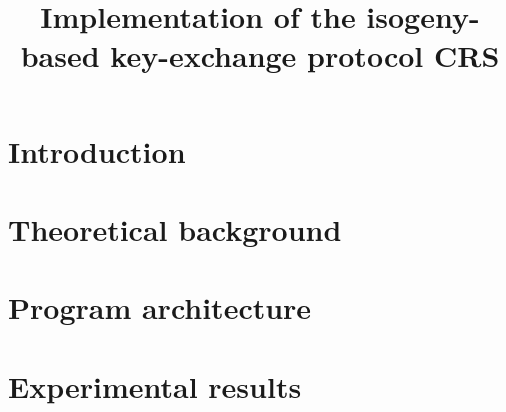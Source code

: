 \documentclass[12pt]{article}
\title{Implementation of the isogeny-based key-exchange protocol CRS}
\author{}
\date{}
\begin{document}
\maketitle
\renewcommand{\contentsname}{Table of content}
\tableofcontents
\newpage

%

\section{Introduction}


\section{Theoretical background}


\newpage
\section{Program architecture}


\newpage
\section{Experimental results}


%
\end{document}
